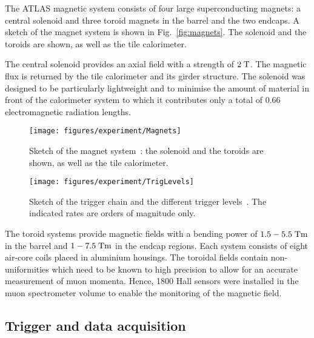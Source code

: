 The ATLAS magnetic system consists of four large superconducting magnets: a central solenoid and three toroid magnets in the barrel and the
two endcaps.
A sketch of the magnet system is shown in Fig.~\ref{fig:magnets}.
The solenoid and the toroids are shown, as well as the tile calorimeter.

The central solenoid provides an axial field with a strength of \mbox{$2 \; \mathrm{T}$}.
The magnetic flux is returned by the tile calorimeter and its girder structure.
The solenoid was designed to be particularly lightweight and to minimise the amount of material in front of the calorimeter system
to which it contributes only a total of 0.66 electromagnetic radiation lengths.

\begin{figure}[h]
\centering
  \begin{minipage}[t][0.55\textwidth][b]{0.45\textwidth}
  \texttt{[image: figures/experiment/Magnets]}
  \caption[Sketch of the magnet system]{
    Sketch of the magnet system~\cite{detectorpaper}:
    the solenoid and the toroids are shown, as well as the tile calorimeter.}
  \label{fig:magnets}
  \end{minipage}
  \hspace{1cm}
  \begin{minipage}[t][0.55\textwidth][b]{0.45\textwidth}
  \texttt{[image: figures/experiment/TrigLevels]}
  \caption[Sketch of the trigger chain]{
    Sketch of the trigger chain and the different trigger levels~\cite{ATLASTDR}.
    The indicated rates are orders of magnitude only.
  }
  \label{fig:triggerdaq}
  \end{minipage}
\end{figure}

The toroid systems provide magnetic fields with a bending power of \mbox{$1.5 - 5.5 \; \mathrm{Tm}$} in the barrel and \mbox{$1 - 7.5 \; \mathrm{Tm}$} in the endcap regions.
Each system consists of eight air-core coils placed in aluminium housings.
The toroidal fields contain non-uniformities which need to be known to high precision to allow for an accurate measurement of muon momenta.
Hence, 1800 Hall sensors were installed in the muon spectrometer volume to enable the monitoring of the magnetic field.


\subsection{Trigger and data acquisition}
\label{sec:triggerDAQ}

